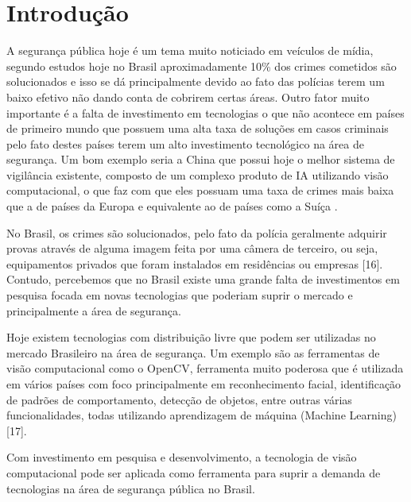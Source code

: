 \chapter{Introdução}\label{cap:introducao}



A segurança pública hoje é um tema muito noticiado em veículos de mídia, segundo estudos hoje no Brasil aproximadamente 10\% dos crimes cometidos são solucionados \cite{um} e isso se dá principalmente devido ao fato das polícias terem um baixo efetivo não dando conta de cobrirem certas áreas. Outro fator muito importante é a falta de investimento em tecnologias o que não acontece em países de primeiro mundo que possuem uma alta taxa de soluções em casos criminais pelo fato destes países terem um alto investimento tecnológico na área de segurança. Um bom exemplo seria a China que possui hoje o melhor sistema de vigilância existente, composto de um complexo produto de IA utilizando visão computacional, o que faz com que eles possuam uma taxa de crimes mais baixa que a de países da Europa e equivalente ao de países como a Suíça \cite{dois}.  

No Brasil, os crimes são solucionados, pelo fato da polícia geralmente adquirir provas através de alguma imagem feita por uma câmera de terceiro, ou seja, equipamentos privados que foram instalados em residências ou empresas [16]. Contudo, percebemos que no Brasil existe uma grande falta de investimentos em pesquisa focada em novas tecnologias que poderiam suprir o mercado e principalmente a área de segurança. 

Hoje existem tecnologias com distribuição livre que podem ser utilizadas no mercado Brasileiro na área de segurança. Um exemplo são as ferramentas de visão computacional como o OpenCV, ferramenta muito poderosa que é utilizada em vários países com foco principalmente em reconhecimento facial, identificação de padrões de comportamento, detecção de objetos, entre outras várias funcionalidades, todas utilizando aprendizagem de máquina (Machine Learning) [17].  

Com investimento em pesquisa e desenvolvimento, a tecnologia de visão computacional pode ser aplicada como ferramenta para suprir a demanda de tecnologias na área de segurança pública no Brasil.


